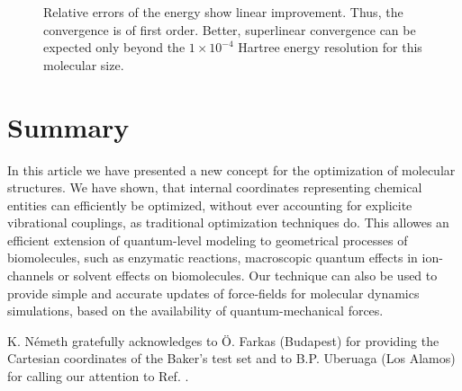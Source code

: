 \documentclass[prl,twocolumn,showpacs,twocolumngrid,superbib]{revtex4}
\begin{document}
\begin{figure}[h]
\caption{
\small  
Relative errors of the energy show linear improvement.
Thus, the convergence is of first order. Better, superlinear
convergence can be expected only beyond the $1\times10^{-4}$ Hartree
energy resolution for this molecular size.
\label{order-of-conv}
}
\end{figure}

\section{Summary}
In this article we have presented a new concept
for the optimization of molecular structures.
We have shown, that internal coordinates representing chemical 
entities can efficiently be optimized, without
ever accounting for explicite vibrational couplings, as traditional
optimization techniques do. This allowes an efficient
extension of quantum-level modeling to geometrical processes
of biomolecules, such as enzymatic reactions, macroscopic quantum 
effects in ion-channels or solvent effects on biomolecules.
Our technique can also be used
to provide simple and accurate updates of force-fields
for molecular dynamics simulations, based on the availability of
quantum-mechanical forces.

\begin{acknowledgments}
K. N{\'e}meth gratefully acknowledges to 
{\"{O}}. Farkas (Budapest) for 
providing the Cartesian coordinates of the Baker's test set and to
B.P. Uberuaga (Los Alamos) for calling our attention to Ref. 
\cite{force-matching}.
\end{acknowledgments}


\end{document}
